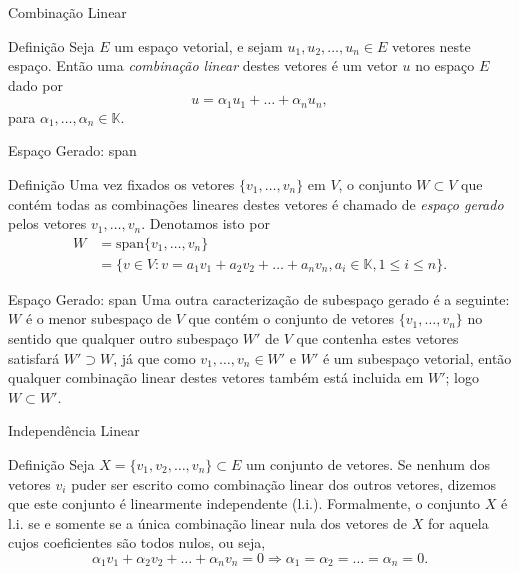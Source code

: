 \documentclass{beamer}
\begin{document}
\begin{darkframes}
\begin{frame}{Combinação Linear}
  \begin{block}{Definição}
    Seja $E$ um espaço vetorial, e sejam $u_1,u_2,\ldots,u_n \in E$ vetores neste espaço. Então uma \emph{combinação linear} destes vetores é um vetor $u$ no espaço $E$ dado por
   \begin{equation*}
     u = \alpha_1 u_1+\ldots+\alpha_n u_n,
   \end{equation*}
   para $\alpha_1,\ldots,\alpha_n \in {\mathbb{K}}$.
 \end{block}
\end{frame}

\begin{frame}{Espaço Gerado: span}
  \begin{block}{Definição}
   Uma vez fixados os vetores $\{ v_1,\ldots,v_n\}$ em $V$, o conjunto $W\subset V$ que contém todas as combinações lineares destes vetores é chamado de \emph{espaço gerado} pelos vetores $v_1,\ldots,v_n$. Denotamos isto por
   \begin{align*}
     W &= \text{span}\{v_1,\ldots,v_n\}\\
     &= \{ v \in V : v = a_1v_1 + a_2v_2 + \ldots + a_n v_n, a_i\in {\mathbb{K}}, 1\leq i \leq n\}.
   \end{align*}
 \end{block}
\end{frame}

\begin{frame}{Espaço Gerado: span}
 Uma outra caracterização de subespaço gerado é a seguinte: $W$ é o menor subespaço de $V$ que contém o conjunto de vetores $\{ v_1,\ldots,v_n\}$ no sentido que qualquer outro subespaço $W'$ de $V$ que contenha estes vetores satisfará $W' \supset W$, já que como $v_1,\ldots,v_n \in W'$ e $W'$ é um subespaço vetorial, então qualquer combinação linear destes vetores também está incluida em $W'$; logo $W\subset W'$.
\end{frame}


\begin{frame}{Independência Linear}
  \begin{block}{Definição}
    Seja $X=\{v_1,v_2,\ldots,v_n\}\subset E$ um conjunto de vetores. Se nenhum dos vetores $v_i$ puder ser escrito como combinação linear dos outros vetores, dizemos que este conjunto é linearmente independente (l.i.). Formalmente, o conjunto $X$ é l.i. se e somente se a única combinação linear nula dos vetores de $X$ for aquela cujos coeficientes são todos nulos, ou seja,
    \begin{equation*}
      \alpha_1v_1+\alpha_2 v_2 + \ldots + \alpha_n v_n = 0 \Rightarrow \alpha_1=\alpha_2=\ldots=\alpha_n=0.
    \end{equation*}
  \end{block}


\end{frame}
\end{darkframes}
\end{document}
